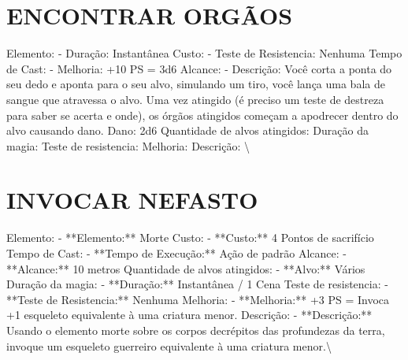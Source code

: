 \documentclass{article}%
\begin{document}
\section{ENCONTRAR ORGÃOS}%
\label{sec:ENCONTRARORGOS}%
Elemento: {-} Duração: Instantânea\newline%
Custo: {-} Teste de Resistencia: Nenhuma\newline%
Tempo de Cast: {-} Melhoria: +10 PS = 3d6\newline%
Alcance: {-} Descrição: Você corta a ponta do seu dedo e aponta para o seu alvo, simulando um tiro, você lança uma bala de sangue que atravessa o alvo. Uma vez atingido (é preciso um teste de destreza para saber se acerta e onde), os órgãos atingidos começam a apodrecer dentro do alvo causando dano. Dano: 2d6\newline%
Quantidade de alvos atingidos: \newline%
Duração da magia: \newline%
Teste de resistencia: \newline%
Melhoria: \newline%
Descrição: \textbackslash{}

%
\section{INVOCAR NEFASTO}%
\label{sec:INVOCARNEFASTO}%
Elemento: {-} **Elemento:** Morte\newline%
Custo: {-} **Custo:** 4 Pontos de sacrifício\newline%
Tempo de Cast: {-} **Tempo de Execução:** Ação de padrão\newline%
Alcance: {-} **Alcance:** 10 metros\newline%
Quantidade de alvos atingidos: {-} **Alvo:** Vários\newline%
Duração da magia: {-} **Duração:** Instantânea / 1 Cena\newline%
Teste de resistencia: {-} **Teste de Resistencia:** Nenhuma\newline%
Melhoria: {-} **Melhoria:** +3 PS = Invoca +1 esqueleto equivalente à uma criatura menor.\newline%
Descrição: {-} **Descrição:** Usando o elemento morte sobre os corpos decrépitos das profundezas da terra, invoque um esqueleto guerreiro equivalente à uma criatura menor.\textbackslash{}

%
\end{document}

